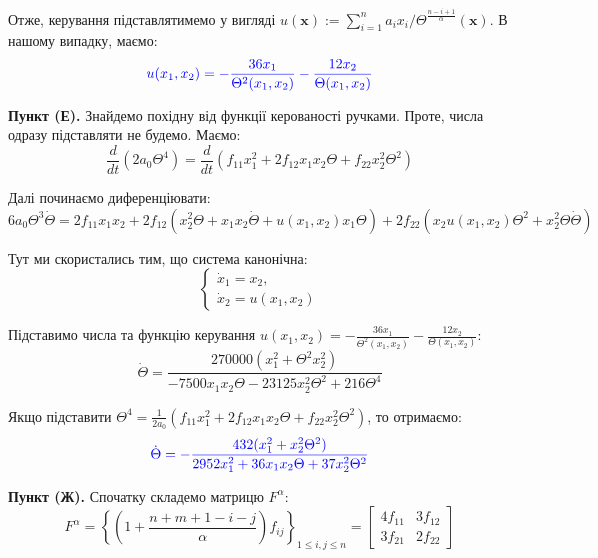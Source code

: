 \documentclass{hw_template}
\begin{document}
Отже, керування підставлятимемо у вигляді $u(\mathbf{x}) := \sum_{i=1}^n a_ix_i/\Theta^{\frac{n-i+1}{\alpha}}(\mathbf{x})$. В нашому випадку, 
маємо:
\begin{equation*}
    \textcolor{blue}{u(x_1,x_2) = -\frac{36x_1}{\Theta^2(x_1,x_2)} - \frac{12x_2}{\Theta(x_1,x_2)}}
\end{equation*}

\textbf{Пункт (Е).} Знайдемо похідну від функції керованості ручками. Проте, числа 
одразу підставляти не будемо. Маємо:
\begin{equation*}
    \frac{d}{dt}\left(2a_0\Theta^4\right) = \frac{d}{dt}\left(f_{11}x_1^2 + 2f_{12}x_1x_2\Theta + f_{22}x_2^2\Theta^2\right)
\end{equation*}

Далі починаємо диференціювати:
\begin{equation*}
    6a_0\Theta^3\dot{\Theta} = 2f_{11}x_1x_2 + 2f_{12}(x_2^2\Theta + x_1x_2\dot{\Theta} + u(x_1,x_2)x_1\Theta) + 2f_{22}(x_2u(x_1,x_2)\Theta^2+x_2^2\Theta\dot{\Theta})
\end{equation*}

Тут ми скористались тим, що система канонічна:
\begin{equation*}
    \begin{cases}
        \dot{x}_1 = x_2, \\
        \dot{x}_2 = u(x_1,x_2)
    \end{cases}
\end{equation*}

Підставимо числа та функцію керування $u(x_1,x_2) = -\frac{36x_1}{\Theta^2(x_1,x_2)} - \frac{12x_2}{\Theta(x_1,x_2)}$:
\begin{equation*}
   \dot{\Theta} = \frac{270000(x_1^2 + \Theta^2 x_2^2)}{-7500x_1x_2\Theta - 23125x_2^2\Theta^2 + 216\Theta^4}
\end{equation*}

Якщо підставити $\Theta^4 = \frac{1}{2a_0}(f_{11}x_1^2 + 2f_{12}x_1x_2\Theta + f_{22}x_2^2\Theta^2)$, то отримаємо:
\begin{equation*}
    \textcolor{blue}{\dot{\Theta} = -\frac{432(x_1^2+x_2^2\Theta^2)}{2952x_1^2 + 36x_1x_2\Theta + 37x_2^2\Theta^2}}
\end{equation*}

\textbf{Пункт (Ж).} Спочатку складемо матрицю $F^{\alpha}$:
\begin{equation*}
    F^{\alpha} = \left\{\left(1+\frac{n+m+1-i-j}{\alpha}\right)f_{ij}\right\}_{1 \leq i,j \leq n} = \begin{bmatrix}
        4f_{11} & 3f_{12} \\
        3f_{21} & 2f_{22}
    \end{bmatrix}
\end{equation*}
\end{document}
